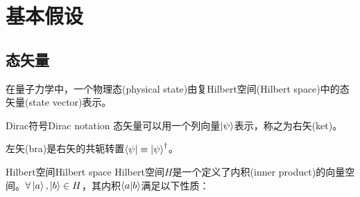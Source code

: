 \chapter{基本假设}

\section{态矢量}

在量子力学中，一个物理态(physical state)由复Hilbert空间(Hilbert space)中的态矢量(state vector)表示。

\begin{definition}{Dirac符号}{Dirac notation}
	态矢量可以用一个列向量$\left\vert \psi\right\rangle$表示，称之为右矢(ket)。
	
	左矢(bra)是右矢的共轭转置$\left\langle \psi\right\vert\equiv\left\vert \psi\right\rangle^\dagger$。
\end{definition}
\begin{definition}{Hilbert空间}{Hilbert space}
	Hilbert空间$H$是一个定义了内积(inner product)的向量空间。$\forall\left\vert a\right\rangle,\left\vert b\right\rangle\in H$，其内积$\left\langle a\middle\vert b\right\rangle$满足以下性质：
\end{definition}


